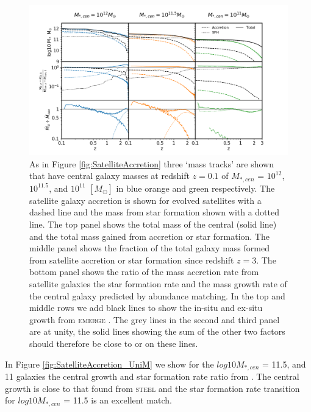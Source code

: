 \begin{figure}
	\centering
	\includegraphics[width = \linewidth]{Appendices/StellarMassAssembly/SatelliteAccretion_EMERGE.png}
    \caption{As in Figure \ref{fig:SatelliteAccretion} three `mass tracks' are shown that have central galaxy masses at redshift $z = 0.1$ of $M_{*,cen}$ = $10^{12}$, $10^{11.5}$, and $10^{11}$ $[M_{\odot}]$ in blue orange and green respectively. The satellite galaxy accretion is shown for evolved satellites with a dashed line and the mass from star formation shown with a dotted line. The top panel shows the total mass of the central (solid line) and the total mass gained from accretion or star formation. The middle panel shows the fraction of the total galaxy mass formed from satellite accretion or star formation since redshift $z=3$. The bottom panel shows the ratio of the mass accretion rate from satellite galaxies the star formation rate and the mass growth rate of the central galaxy predicted by abundance matching. In the top and middle rows we add black lines to show the in-situ and ex-situ growth from \textsc{emerge} \citet{Moster2018Emerge10}. The grey lines in the second and third panel are at unity, the solid lines showing the sum of the other two factors should therefore be close to or on these lines.}
	\label{fig:SatelliteAccretion_EMERGE}
\end{figure}

In Figure \ref{fig:SatelliteAccretion_UniM} we show for the $log 10 M_{*,cen}$ = 11.5, and 11 galaxies the central growth and star formation rate ratio from \citet{Behroozi2019UniverseMachine:010}. The central growth is close to that found from \textsc{steel} and the star formation rate transition for  $log 10 M_{*,cen}$ = 11.5 is an excellent match.

